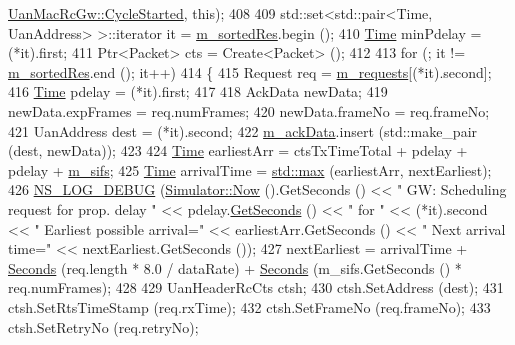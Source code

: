 \begin{DoxyCode}
      \hyperlink{classns3_1_1UanMacRcGw_a9fba6730296ff817e04a485c8fc07d96}{UanMacRcGw::CycleStarted}, \textcolor{keyword}{this});
408 
409   std::set<std::pair<Time, UanAddress> >::iterator it = \hyperlink{classns3_1_1UanMacRcGw_afe8430ebad788663b695fe54593f5fcf}{m\_sortedRes}.begin ();
410   \hyperlink{namespacens3_1_1TracedValueCallback_a7ffd3e7c142ffe7c8a1d2db9b8de38ec}{Time} minPdelay = (*it).first;
411   Ptr<Packet> cts = Create<Packet> ();
412 
413   \textcolor{keywordflow}{for} (; it != \hyperlink{classns3_1_1UanMacRcGw_afe8430ebad788663b695fe54593f5fcf}{m\_sortedRes}.end (); it++)
414     \{
415       Request req = \hyperlink{classns3_1_1UanMacRcGw_ace02d765d83abd8ea6513fd7813626e0}{m\_requests}[(*it).second];
416       \hyperlink{namespacens3_1_1TracedValueCallback_a7ffd3e7c142ffe7c8a1d2db9b8de38ec}{Time} pdelay = (*it).first;
417 
418       AckData newData;
419       newData.expFrames = req.numFrames;
420       newData.frameNo = req.frameNo;
421       UanAddress dest = (*it).second;
422       \hyperlink{classns3_1_1UanMacRcGw_a08da08fa5109dcd1147ef2c17aa1f061}{m\_ackData}.insert (std::make\_pair (dest, newData));
423 
424       \hyperlink{namespacens3_1_1TracedValueCallback_a7ffd3e7c142ffe7c8a1d2db9b8de38ec}{Time} earliestArr = ctsTxTimeTotal + pdelay + pdelay + \hyperlink{classns3_1_1UanMacRcGw_a563f1bf04fd1d1cf01c6590329e58b4c}{m\_sifs};
425       \hyperlink{namespacens3_1_1TracedValueCallback_a7ffd3e7c142ffe7c8a1d2db9b8de38ec}{Time} arrivalTime = \hyperlink{80211b_8c_affe776513b24d84b39af8ab0930fef7f}{std::max} (earliestArr, nextEarliest);
426       \hyperlink{group__logging_ga413f1886406d49f59a6a0a89b77b4d0a}{NS\_LOG\_DEBUG} (\hyperlink{classns3_1_1Simulator_ac3178fa975b419f7875e7105be122800}{Simulator::Now} ().GetSeconds () << \textcolor{stringliteral}{" GW: Scheduling request
       for prop. delay "} << pdelay.\hyperlink{classns3_1_1Time_a8f20d5c3b0902d7b4320982f340b57c8}{GetSeconds} () << \textcolor{stringliteral}{" for "} << (*it).second << \textcolor{stringliteral}{" Earliest possible
       arrival="} << earliestArr.GetSeconds () << \textcolor{stringliteral}{"  Next arrival time="} << nextEarliest.GetSeconds ());
427       nextEarliest = arrivalTime + \hyperlink{group__timecivil_ga33c34b816f8ff6628e33d5c8e9713b9e}{Seconds} (req.length * 8.0 / dataRate) + 
      \hyperlink{group__timecivil_ga33c34b816f8ff6628e33d5c8e9713b9e}{Seconds} (m\_sifs.GetSeconds () * req.numFrames);
428 
429       UanHeaderRcCts ctsh;
430       ctsh.SetAddress (dest);
431       ctsh.SetRtsTimeStamp (req.rxTime);
432       ctsh.SetFrameNo (req.frameNo);
433       ctsh.SetRetryNo (req.retryNo);

\end{DoxyCode}

